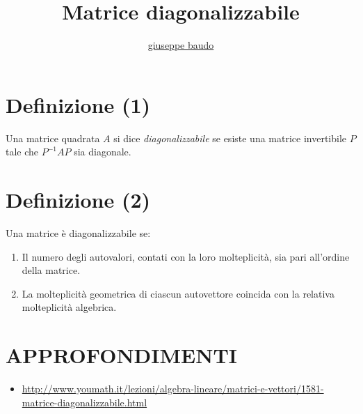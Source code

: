 \documentclass[a4paper,10pt]{article}
\title{Matrice diagonalizzabile}
\author{\href{http://www.baudo.hol.es}{giuseppe baudo}}
\begin{document}
\maketitle

\section{Definizione (1)}
Una matrice quadrata $A$ si dice \textit{diagonalizzabile} se esiste una matrice invertibile $P$ tale che $P^{-1}AP$ sia diagonale.

\section{Definizione (2)}
Una matrice è diagonalizzabile se:
\begin{enumerate}
 \item Il numero degli autovalori, contati con la loro molteplicità, sia pari all'ordine della matrice.
 \item La molteplicità geometrica di ciascun autovettore coincida con la relativa molteplicità algebrica.
\end{enumerate}

\section{APPROFONDIMENTI}
\begin{itemize}
 \item \url{http://www.youmath.it/lezioni/algebra-lineare/matrici-e-vettori/1581-matrice-diagonalizzabile.html}
\end{itemize}
\end{document}
